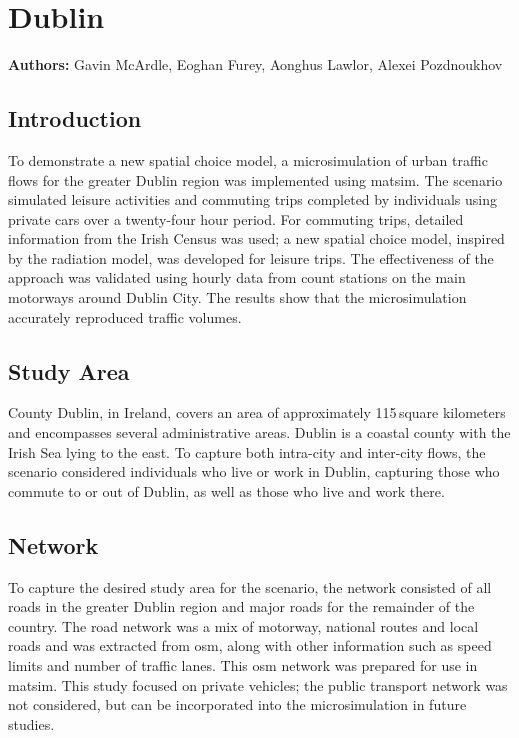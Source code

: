 \chapter{Dublin}
\label{ch:dublin}
\hfill \textbf{Authors:} Gavin McArdle, Eoghan Furey, Aonghus Lawlor, Alexei Pozdnoukhov


\section{Introduction}
To demonstrate a new spatial choice model, a \gls{microsimulation} of urban traffic flows for the greater Dublin region was implemented using \gls{matsim}. The scenario simulated leisure activities and commuting trips completed by individuals using private cars over a twenty-four hour period. For commuting trips, detailed information from the Irish Census was used; a new spatial choice model, inspired by the radiation model, was developed for leisure trips. The effectiveness of the approach was validated using hourly data from count stations on the main motorways around Dublin City. The results show that the \gls{microsimulation} accurately reproduced traffic volumes.

\section{Study Area}
County Dublin, in Ireland, covers an area of approximately 115\,square kilometers and encompasses several administrative areas. Dublin is a coastal county with the Irish Sea lying to the east. To capture both intra-city and inter-city flows, the scenario considered individuals who live or work in Dublin, capturing those who commute to or out of Dublin, as well as those who live and work there.

\section{Network}
To capture the desired study area for the scenario, the network consisted of all roads in the greater Dublin region and major roads for the remainder of the country. The road network was a mix of motorway, national routes and local roads and was extracted from \gls{osm}, along with other information such as speed limits and number of traffic lanes. This \gls{osm} network was prepared for use in \gls{matsim}.  This study focused on private vehicles; the public transport network was not considered, but can be incorporated into the \gls{microsimulation} in future studies.

